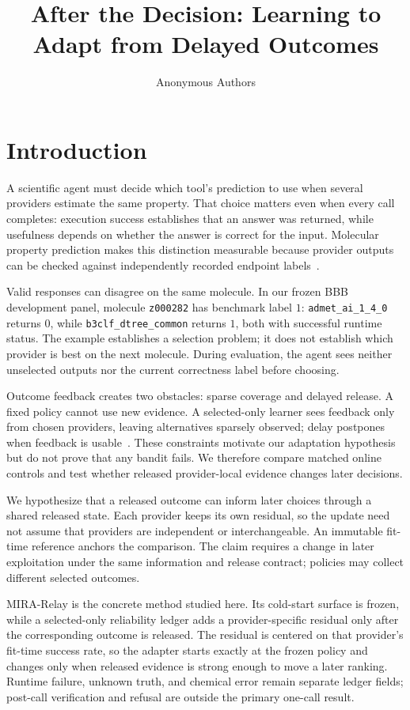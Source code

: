 \documentclass[sigconf,anonymous]{aamas}
\title{After the Decision: Learning to Adapt from Delayed Outcomes}
\author{Anonymous Authors}
\begin{document}
\maketitle

\section{Introduction}
A scientific agent must decide which tool's prediction to use when several providers estimate the same property. That choice matters even when every call completes: execution success establishes that an answer was returned, while usefulness depends on whether the answer is correct for the input. Molecular property prediction makes this distinction measurable because provider outputs can be checked against independently recorded endpoint labels~\cite{huang2021tdc,wu2018moleculenet,meng2021b3db}.

Valid responses can disagree on the same molecule. In our frozen BBB development panel, molecule \texttt{z000282} has benchmark label $1$: \texttt{admet\_ai\_1\_4\_0} returns $0$, while \texttt{b3clf\_dtree\_common} returns $1$, both with successful runtime status. The example establishes a selection problem; it does not establish which provider is best on the next molecule. During evaluation, the agent sees neither unselected outputs nor the current correctness label before choosing.

Outcome feedback creates two obstacles: sparse coverage and delayed release. A fixed policy cannot use new evidence. A selected-only learner sees feedback only from chosen providers, leaving alternatives sparsely observed; delay postpones when feedback is usable~\cite{joulani2013online,vernade2018linear}. These constraints motivate our adaptation hypothesis but do not prove that any bandit fails. We therefore compare matched online controls and test whether released provider-local evidence changes later decisions.

We hypothesize that a released outcome can inform later choices through a shared released state. Each provider keeps its own residual, so the update need not assume that providers are independent or interchangeable. An immutable fit-time reference anchors the comparison. The claim requires a change in later exploitation under the same information and release contract; policies may collect different selected outcomes.

MIRA-Relay is the concrete method studied here. Its cold-start surface is frozen, while a selected-only reliability ledger adds a provider-specific residual only after the corresponding outcome is released. The residual is centered on that provider's fit-time success rate, so the adapter starts exactly at the frozen policy and changes only when released evidence is strong enough to move a later ranking. Runtime failure, unknown truth, and chemical error remain separate ledger fields; post-call verification and refusal are outside the primary one-call result.
\end{document}
